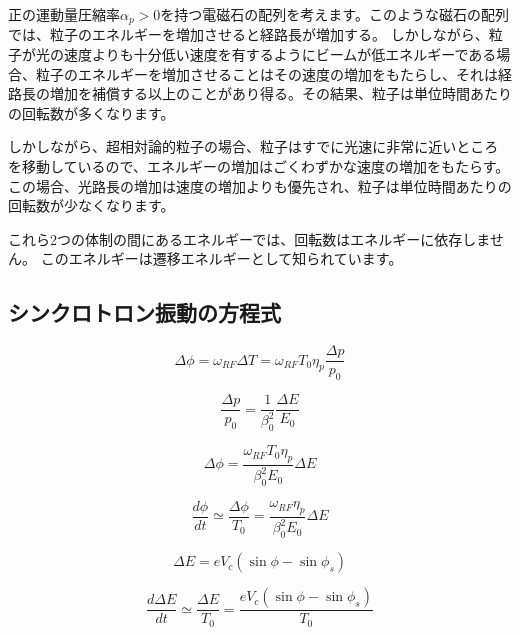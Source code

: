 \documentclass[10pt,a4paper]{ltjsarticle}
\begin{document}
正の運動量圧縮率$\alpha_p>0$を持つ電磁石の配列を考えます。このような磁石の配列では、粒子のエネルギーを増加させると経路長が増加する。 しかしながら、粒子が光の速度よりも十分低い速度を有するようにビームが低エネルギーである場合、粒子のエネルギーを増加させることはその速度の増加をもたらし、それは経路長の増加を補償する以上のことがあり得る。その結果、粒子は単位時間あたりの回転数が多くなります。

しかしながら、超相対論的粒子の場合、粒子はすでに光速に非常に近いところを移動しているので、エネルギーの増加はごくわずかな速度の増加をもたらす。 この場合、光路長の増加は速度の増加よりも優先され、粒子は単位時間あたりの回転数が少なくなります。

これら2つの体制の間にあるエネルギーでは、回転数はエネルギーに依存しません。 このエネルギーは遷移エネルギーとして知られています。

\subsection{シンクロトロン振動の方程式}
%
\begin{equation}
    \Delta \phi = \omega_{RF} \Delta T = \omega_{RF} T_0 \eta_p\frac{\Delta p}{p_0}
\end{equation}

\begin{equation}
    \frac{\Delta p}{p_0} = \frac{1}{\beta_0^2}\frac{\Delta E}{E_0}
    \label{delta_p}
\end{equation}

\begin{equation}
    \Delta \phi = \frac{\omega_{RF} T_0 \eta_p}{\beta_0^2 E_0}\Delta E
\end{equation}

\begin{equation}
    \frac{d\phi}{dt} \simeq \frac{\Delta\phi}{T_0} = \frac{\omega_{RF}\eta_p}{\beta_0^2 E_0}\Delta E
\end{equation}

\begin{equation}
    \Delta E = e V_c (\sin \phi - \sin \phi_s)
\end{equation}

\begin{equation}
    \frac{d\Delta E}{dt} \simeq \frac{\Delta E}{T_0}= \frac{e V_c (\sin\phi - \sin\phi_s)}{T_0}
\end{equation}
\end{document}
